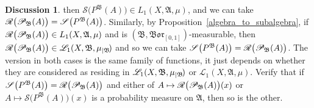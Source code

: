 \documentclass[
twoside=true,
paper=letter,
fontsize=9pt,
pagesize=auto,
leqno,
openany,
headsepline,
overfullrule,
]{scrbook}
\theoremstyle{plain}
\theoremstyle{plain}
\theoremstyle{definition}
\newtheorem{discussion}[thm]{Discussion}
\theoremstyle{bfnoteitalic}
\theoremstyle{bfnoteroman}
\newcommand{\sigalg}[1]{\mathfrak{#1}}
\newcommand{\cali}[1]{\mathscr{#1}}
\newcommand{\condprobop}[1]{\mathop{\cali{P}\hspace{-1pt}}\nolimits_{#1}}
\newcommand{\borel}{\mathfrak{Bor}}
\newcommand{\restrictedto}[1]{_{\lvert#1}\kern-1.5pt}
\newcommand{\sigmaalgebra}{\sigalg{A}}
\newcommand{\sigmaalgebraii}{\sigalg{B}}
\newcommand{\Lone}{L_1(\measurespace, \sigmaalgebra, \measure)}
\newcommand{\caliLone}{\cali{L}_1(\measurespace, \sigmaalgebra, \measure)}
\newcommand{\measurespace}{X}
\newcommand{\measure}{\mu}
\newcommand{\seti}{A}
\begin{document}
\begin{discussion}
then
$\cali{S} \bigl( P^\sigmaalgebraii(\seti) \bigr)
\in
\Lone$,
and we can take
$\cali{R}\bigl( \condprobop{\sigmaalgebraii}(\seti)\bigr)
=
\cali{S} \bigl( P^\sigmaalgebraii(\seti) \bigr)$.
Similarly, by Proposition~\ref{algebra_to_subalgebra}, if
$\cali{R}\bigl( \condprobop{\sigmaalgebraii}(\seti)\bigr)
\in
\Lone$ and
is $(\sigmaalgebraii,\borel_{[0,1]})$\hyp{}measurable,
then
$\cali{R}\bigl( \condprobop{\sigmaalgebraii}(\seti)\bigr)
\in
\cali{L}_1(\measurespace, \sigmaalgebraii,\measure\restrictedto{\sigmaalgebraii})$
and so we can take
$\cali{S} \bigl( P^\sigmaalgebraii(\seti) \bigr)
=
\cali{R}\bigl( \condprobop{\sigmaalgebraii}(\seti)\bigr)$.
The version in both cases is the same family of functions, it just depends on whether they are considered as residing in
$\cali{L}_1(\measurespace, \sigmaalgebraii,\measure\restrictedto{\sigmaalgebraii})$
or
$\caliLone$.
Verify that if
$\cali{S} \bigl( P^\sigmaalgebraii(\seti) \bigr)
=
\cali{R}\bigl( \condprobop{\sigmaalgebraii}(\seti)\bigr)$
and either of
$\seti\mapsto \cali{R}\bigl( \condprobop{\sigmaalgebraii}(\seti)\bigr)(x)$
or
$\seti\mapsto \cali{S} \bigl( P^\sigmaalgebraii(\seti) \bigr)(x)$
is a probability measure on $\sigmaalgebra$, then so is the other.
\end{discussion}
\end{document}
